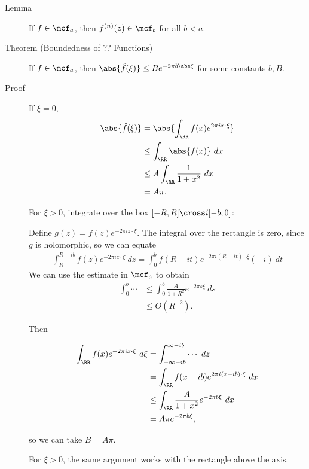 \begin{description}
\item[Lemma]
If \(f\in \mcf_a\), then \(f^{(n)}(z) \in \mcf_b\) for all \(b < a\).
\item[Theorem (Boundedness of ?? Functions)]
If \(f\in \mcf_a\), then
\(\abs{\hat f(\xi)} \leq B e^{-2\pi b \abs \xi}\) for some constants
\(b, B\).
\item[Proof]
If \(\xi = 0\), \begin{align*}
\abs{ \hat f(\xi) }
&= \abs{\int_\RR f(x) e^{2\pi i x \cdot \xi}} \\
&\leq \int_\RR \abs{f(x)} ~dx \\
&\leq A \int_\RR \frac 1 {1+x^2} ~dx \\
&= A\pi
.\end{align*}

For \(\xi > 0\), integrate over the box \([-R, R]\cross i[-b, 0]\):

\begin{center}

\end{center}

Define \(g(z) = f(z) e^{-2\pi i z \cdot \xi}\). The integral over the
rectangle is zero, since \(g\) is holomorphic, so we can equate
\begin{align*}
\int_R^{R-ib} f(z) e^{-2\pi i z \cdot \xi} ~dz = \int_0^b f(R - it) e^{-2\pi i (R-it)\cdot \xi} (-i)~dt
\end{align*} We can use the estimate in \(\mcf_a\) to obtain
\begin{align*}
\int_0^b \cdots 
&\leq \int_0^b \frac{A}{1+R^2} e^{-2\pi s \xi} ~ds \\
&\leq O(R^{-2})
.\end{align*}

Then

\begin{align*}
\int_\RR f(x) e^{-2\pi i x \cdot \xi} ~d\xi 
&= \int_{-\infty - ib}^{\infty - ib} \cdots ~dz\\
&= \int_\RR f(x-ib) e^{2\pi i (x - ib)\cdot \xi} ~dx \\ 
&\leq \int_\RR \frac{A}{1+x^2} e^{-2\pi b \xi} ~dx \\
&= A\pi e^{-2\pi b \xi}
,\end{align*}

so we can take \(B = A\pi\).

For \(\xi > 0\), the same argument works with the rectangle above the
axis.
\end{description}


